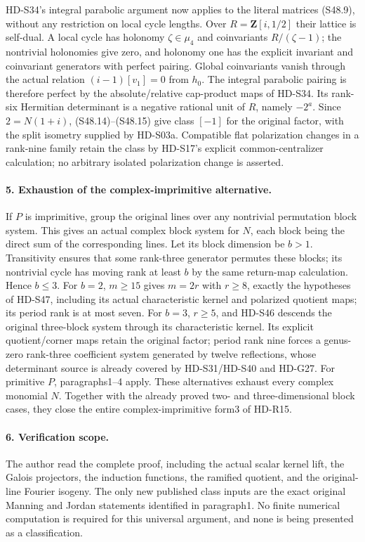 HD-S34's integral parabolic argument now applies to the
literal matrices (S48.9), without any restriction on local
cycle lengths. Over \(R=\mathbf Z[i,1/2]\) their lattice
is self-dual. A local cycle has holonomy \(\zeta\in\mu_4\)
and coinvariants \(R/(\zeta-1)\); the nontrivial holonomies
give zero, and holonomy one has the explicit invariant and
coinvariant generators with perfect pairing. Global
coinvariants vanish through the actual relation
\((i-1)[v_1]=0\) from \(h_0\).
The integral parabolic pairing is therefore perfect by the
absolute/relative cap-product maps of HD-S34. Its rank-six
Hermitian determinant is a negative rational unit of \(R\),
namely \(-2^a\). Since \(2=N(1+i)\), (S48.14)--(S48.15)
give class \([-1]\) for the original factor, with the split
isometry supplied by HD-S03a. Compatible flat polarization
changes in a rank-nine family retain the class by HD-S17's
explicit common-centralizer calculation; no arbitrary isolated
polarization change is asserted.

\paragraph{5. Exhaustion of the complex-imprimitive alternative.}
If \(P\) is imprimitive, group the original lines over any
nontrivial permutation block system. This gives an actual
complex block system for \(N\), each block being the direct
sum of the corresponding lines. Let its block dimension be
\(b>1\). Transitivity ensures that some rank-three generator
permutes these blocks; its nontrivial cycle has moving rank at
least \(b\) by the same return-map calculation. Hence
\(b\le3\). For \(b=2\), \(m\ge15\) gives
\(m=2r\) with \(r\ge8\), exactly the hypotheses of
HD-S47, including its actual characteristic kernel and
polarized quotient maps; its period rank is at most seven.
For \(b=3\), \(r\ge5\), and HD-S46 descends the
original three-block system through its characteristic kernel.
Its explicit quotient/corner maps retain the original factor;
period rank nine forces a genus-zero rank-three coefficient
system generated by twelve reflections, whose determinant
source is already covered by HD-S31/HD-S40 and HD-G27.
For primitive \(P\), paragraphs1--4 apply. These alternatives
exhaust every complex monomial \(N\). Together with the
already proved two- and three-dimensional block cases, they
close the entire complex-imprimitive form3 of HD-R15.

\paragraph{6. Verification scope.}
The author read the complete proof, including the actual scalar
kernel lift, the Galois projectors, the induction functions,
the ramified quotient, and the original-line Fourier isogeny.
The only new published class inputs are the exact original
Manning and Jordan statements identified in paragraph1.
No finite numerical computation is required for this universal
argument, and none is being presented as a classification.
